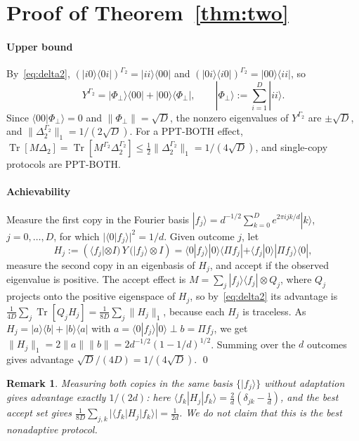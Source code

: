 \documentclass[pdflatex,sn-mathphys-num]{sn-jnl}%
\theoremstyle{thmstyleone}
\theoremstyle{thmstylethree}
\theoremstyle{thmstyletwo}
\newtheorem{remark}[theorem]{Remark}
\newcommand{\Tr}{\operatorname{Tr}}
\newcommand{\ket}[1]{|#1\rangle}
\newcommand{\bra}[1]{\langle #1|}
\begin{document}
\section{Proof of Theorem~\ref{thm:two}}\label{sec:two}

\paragraph{Upper bound} By~\eqref{eq:delta2}, $(\ket{i0}\bra{0i})^{\Gamma_2}=\ket{ii}\bra{00}$ and
$(\ket{0i}\bra{i0})^{\Gamma_2}=\ket{00}\bra{ii}$, so
\[
Y^{\Gamma_2}=\ket{\Phi_\perp}\bra{00}+\ket{00}\bra{\Phi_\perp},\qquad \ket{\Phi_\perp}:=\sum_{i=1}^D\ket{ii}.
\]
Since $\langle00|\Phi_\perp\rangle=0$ and $\|\Phi_\perp\|=\sqrt D$, the
nonzero eigenvalues of $Y^{\Gamma_2}$ are $\pm\sqrt D$, and $\|\Delta_2^{\Gamma_2}\|_1=1/(2\sqrt D)$. For a PPT-BOTH
effect, $\Tr[M\Delta_2]=\Tr[M^{\Gamma_2}\Delta_2^{\Gamma_2}]\le\tfrac12\|\Delta_2^{\Gamma_2}\|_1=1/(4\sqrt D)$, and
single-copy protocols are PPT-BOTH.

\paragraph{Achievability} Measure the first copy in the Fourier basis $\ket{f_j}=d^{-1/2}\sum_{k=0}^De^{2\pi
ijk/d}\ket k$, $j=0,\dots,D$, for which $|\langle0|f_j\rangle|^2=1/d$. Given outcome $j$, let
\[
H_j:=(\bra{f_j}\otimes I)\,Y\,(\ket{f_j}\otimes I)=\langle0|f_j\rangle\ket0\bra{\Pi f_j}+\langle f_j|0\rangle\ket{\Pi
f_j}\bra0,
\]
measure the second copy in an eigenbasis of $H_j$, and accept if the observed eigenvalue is positive. The accept effect
is $M=\sum_j\ket{f_j}\bra{f_j}\otimes Q_j$, where $Q_j$ projects onto the positive eigenspace of $H_j$, so
by~\eqref{eq:delta2} its advantage is $\frac1{4D}\sum_j\Tr[Q_jH_j]=\frac1{8D}\sum_j\|H_j\|_1$, because each $H_j$ is
traceless. As $H_j=\ket a\bra b+\ket b\bra a$ with $a=\langle0|f_j\rangle\ket0\perp b=\Pi f_j$, we get
$\|H_j\|_1=2\|a\|\|b\|=2d^{-1/2}(1-1/d)^{1/2}$. Summing over the $d$ outcomes gives advantage $\sqrt D/(4D)=1/(4\sqrt D)$.
\qed

\begin{remark}\label{rem:fourier}
Measuring both copies in the same basis $\{\ket{f_j}\}$ without adaptation gives advantage exactly $1/(2d)$: here
$\bra{f_k}H_j\ket{f_k}=\tfrac2d(\delta_{jk}-\tfrac1d)$, and the best accept set gives
$\frac1{8D}\sum_{j,k}|\bra{f_k}H_j\ket{f_k}|=\frac1{2d}$. We do not claim that this is the best nonadaptive protocol.
\end{remark}
\end{document}
